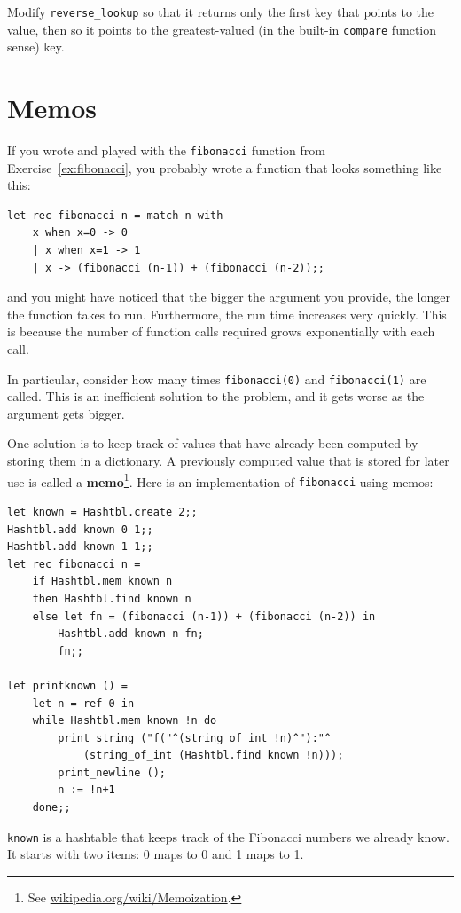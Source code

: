 \documentclass[10pt]{book}
\begin{document}
{\begin{ex}
Modify \verb"reverse_lookup" so that it returns only the first key that points to the value, then so it points to the greatest-valued (in the built-in {\tt compare} function sense) key.
\end{ex}

\section{Memos}
If you wrote and played with the {\tt fibonacci} function from
Exercise~\ref{ex:fibonacci}, you probably wrote a function that looks something like this:
\beforeverb
\begin{verbatim}
let rec fibonacci n = match n with
	x when x=0 -> 0
	| x when x=1 -> 1
	| x -> (fibonacci (n-1)) + (fibonacci (n-2));;
\end{verbatim}
\afterverb
and you might have noticed that the bigger
the argument you provide, the longer the function takes to run.
Furthermore, the run time increases very quickly. This is because the
number of function calls required grows exponentially with each call.


In particular, consider how many times {\tt fibonacci(0)} and {\tt fibonacci(1)} 
are called. This is an inefficient solution to the problem, and it gets
worse as the argument gets bigger.


One solution is to keep track of values that have already been
computed by storing them in a dictionary.  A previously computed value
that is stored for later use is called a {\bf memo}\footnote{See
  \url{wikipedia.org/wiki/Memoization}.}.  Here is an
implementation of {\tt fibonacci} using memos:

\beforeverb
\begin{verbatim}
let known = Hashtbl.create 2;;
Hashtbl.add known 0 1;;
Hashtbl.add known 1 1;;
let rec fibonacci n =
	if Hashtbl.mem known n
	then Hashtbl.find known n
	else let fn = (fibonacci (n-1)) + (fibonacci (n-2)) in
		Hashtbl.add known n fn;
		fn;;

let printknown () = 
	let n = ref 0 in
	while Hashtbl.mem known !n do
		print_string ("f("^(string_of_int !n)^"):"^
			(string_of_int (Hashtbl.find known !n)));
		print_newline ();
		n := !n+1
	done;;
\end{verbatim}
\afterverb
%
{\tt known} is a hashtable that keeps track of the Fibonacci
numbers we already know.  It starts with
two items: 0 maps to 0 and 1 maps to 1.

}
\end{document}
